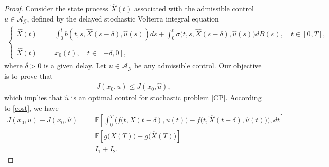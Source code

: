 \documentclass[12pt]{article}
\theoremstyle{remark}
\numberwithin{equation}{section}
\begin{document}
\begin{proof}
Consider the state process $\hat{X}(t)$ associated with the admissible control $\hat{u} \in \mathcal{A}_{\mathcal{G}}$, defined by the delayed stochastic Volterra integral equation
\begin{eqnarray*}
\left\{
\begin{array}{lll}
\hat{X}(t) & = & \displaystyle \int_{0}^{t} b(t,s,\hat{X}(s-\delta),\hat{u}(s))ds+ \int_{0}^{t} \sigma\big(t,s,\hat{X}(s-\delta),\hat{u}(s)\big)dB(s), \quad t \in [0,T], \\\\
\hat{X}(t) & = & x_{0}(t), \quad t \in [-\delta,0],
\end{array}
\right.
\end{eqnarray*}
where $\delta > 0$ is a given delay.
Let $u \in\mathcal{A}_{\mathcal{G}}$ be any admissible control. Our objective is to prove that
\begin{eqnarray*}
J(x_{0},u) \leq J(x_{0},\hat{u})	,
\end{eqnarray*}
which implies that $\hat{u}$ is an optimal control for stochastic problem \eqref{CP}.
According to \eqref{cost}, we have 
\begin{eqnarray*}
J(x_0,u) - J(x_0,\hat{u})&=& \mathbb{E} \left[ \int_0^T \Big( f\big(t, X(t-\delta), u(t)\big) - f\big(t, \hat{X}(t-\delta), \hat{u}(t)\big) \Big), dt \right]\\
&& \mathbb{E} \left[ g\big(X(T)\big) - g\big(\hat{X}(T)\big) \right]\\
&=& I_1 + I_2.
\end{eqnarray*}


\end{proof}
\end{document}
